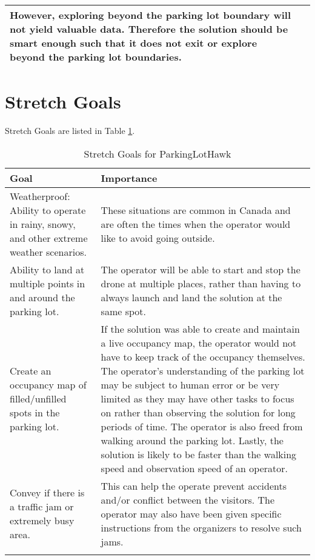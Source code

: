 \documentclass{article}
\begin{document}
\begin{table}
\begin{tabular}{ | m{5cm} | m{7cm} | }
However, exploring beyond the parking lot boundary will not yield valuable data. Therefore the solution should be smart enough such that it does not exit or explore beyond the parking lot boundaries.
 \\ 
  \hline
  
\end{tabular}
\end{table}%



\section{Stretch Goals}
Stretch Goals are listed in Table \ref{table:Stretch}.
\begin{table}
\Centering
\caption {Stretch Goals for ParkingLotHawk} 
\label{table:Stretch}
\begin{tabular}{ | m{5cm} | m{7cm} | } 
  \hline
  Goal & Importance \\ 
  \hline
  Weatherproof: Ability to operate in rainy, snowy, and other extreme weather scenarios.
& These situations are common in Canada and are often the times when the operator would like to avoid going outside.

  \\ 
  \hline
  Ability to land at multiple points in and around the parking lot.
 & The operator will be able to start and stop the drone at multiple places, rather than having to always launch and land the solution at the same spot.
 
 \\ 
  \hline
  Create an occupancy map of filled/unfilled spots in the parking lot. 
 & If the solution was able to create and maintain a live occupancy map, the operator would not have to keep track of the occupancy themselves. The operator's understanding of the parking lot may be subject to human error or be very limited as they may have other tasks to focus on rather than observing the solution for long periods of time. The operator is also freed from walking around the parking lot. Lastly, the solution is likely to be faster than the walking speed and observation speed of an operator.

 \\ 
  \hline
  Convey if there is a traffic jam or extremely busy area.
 & This can help the operate prevent accidents and/or conflict between the visitors. The operator may also have been given specific instructions from the organizers to resolve such jams.
 \\ 
  
 \\ 
  \hline
\end{tabular}
\end{table}%
\end{document}
